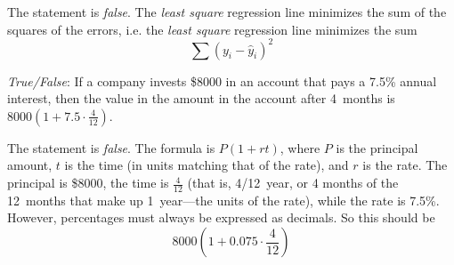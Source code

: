 \documentclass[11pt,letterpaper]{article}
\begin{document}
\sol The statement is \textit{false}. The \textit{least square} regression line minimizes the sum of the squares of the errors, i.e. the \textit{least square} regression line minimizes the sum
	\[
	\sum (y_i - \widehat{y}_i)^2 
	\] \pvspace{1cm}



\quizsol \textit{True/False}: If a company invests \$8000 in an account that pays a 7.5\% annual interest, then the value in the amount in the account after 4~months is $8000 \left(1 + 7.5 \cdot \frac{4}{12} \right)$. \pspace

\sol The statement is \textit{false}. The formula is $P (1 + rt)$, where $P$ is the principal amount, $t$ is the time (in units matching that of the rate), and $r$ is the rate. The principal is \$8000, the time is $\frac{4}{12}$ (that is, 4/12~year, or 4 months of the 12~months that make up 1~year---the units of the rate), while the rate is 7.5\%. However, percentages must always be expressed as decimals. So this should be
	\[
	8000 \left(1 + 0.075 \cdot \frac{4}{12} \right)
	\]
\end{document}

